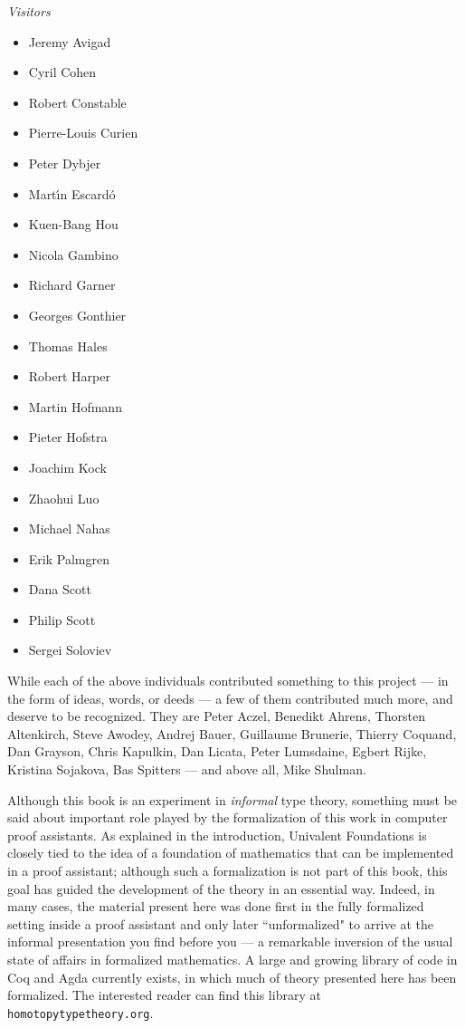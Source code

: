 {%
\centerline{\emph{Visitors}}
%
\begin{multicols}{3}{
\begin{itemize}
\item[] Jeremy Avigad
\item[] Cyril Cohen
\item[] Robert Constable
\item[] Pierre-Louis Curien
\item[] Peter Dybjer
\item[] Mart{\'\i}n Escard{\'o}
\item[] Kuen-Bang Hou
\item[] Nicola Gambino
\item[] Richard Garner
\item[] Georges Gonthier
\item[] Thomas Hales
\item[] Robert Harper
\item[] Martin Hofmann
\item[] Pieter Hofstra
\item[] Joachim Kock
\item[] Zhaohui Luo
\item[] Michael Nahas
\item[] Erik Palmgren
\item[] Dana Scott
\item[] Philip Scott
\item[] Sergei Soloviev
\end{itemize}
}
\end{multicols}

\noindent While each of the above individuals contributed something to this project --- in the form of ideas, words, or deeds --- a few of them contributed much more, and deserve to be recognized.  They are Peter Aczel, Benedikt Ahrens, Thorsten Altenkirch,  Steve Awodey, Andrej Bauer, Guillaume Brunerie, Thierry Coquand, Dan Grayson, Chris Kapulkin, Dan Licata, Peter Lumsdaine, Egbert Rijke, Kristina Sojakova, Bas Spitters --- and above all, Mike Shulman.


Although this book is an experiment in \emph{informal} type theory, something must be said about important role played by the formalization of this work in  computer proof assistants.  As explained in the introduction, Univalent Foundations is closely tied to the idea of a foundation of mathematics that can be implemented in a proof assistant; although such a formalization is not part of this book, this goal has guided the development of the theory in an essential way. Indeed, in many cases, the material present here was done first in the fully formalized setting inside a proof assistant and only later ``unformalized" to arrive at the informal presentation you find before you --- a remarkable inversion of the usual state of affairs in formalized mathematics.   A large and growing library of code in Coq and Agda currently exists, in which much of theory presented here has been formalized.  The interested reader can find this library at {\tt homotopytypetheory.org}.

}
